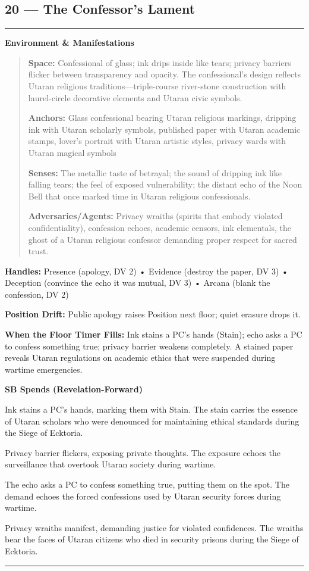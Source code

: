 \documentclass[18pt, letterpaper, twoside]{article}
\newenvironment{floorbox}[1]{%
    \begin{center}
    \begin{minipage}{0.95\textwidth}
    \subsection*{#1}
    \vspace{-0.5em}
    \rule{\textwidth}{0.5pt}
    \vspace{0.5em}
}{%
    \vspace{0.5em}
    \rule{\textwidth}{0.5pt}
    \end{minipage}
    \end{center}
}
\newenvironment{gmnote}[1]{%
    \vspace{0.5em}
    \noindent\textbf{#1}
    \begin{quote}
}{%
    \end{quote}
    \vspace{0.5em}
}
\newcommand{\handles}[1]{\noindent\textbf{Handles:} #1\par}
\newcommand{\sbitem}[2]{\item[#1 SB:] #2}
\begin{document}
\begin{floorbox}{20 --- The Confessor's Lament}
\begin{gmnote}{Environment \& Manifestations}
\textbf{Space:} Confessional of glass; ink drips inside like tears; privacy barriers flicker between transparency and opacity. The confessional's design reflects Utaran religious traditions---triple-course river-stone construction with laurel-circle decorative elements and Utaran civic symbols.

\textbf{Anchors:} Glass confessional bearing Utaran religious markings, dripping ink with Utaran scholarly symbols, published paper with Utaran academic stamps, lover's portrait with Utaran artistic styles, privacy wards with Utaran magical symbols

\textbf{Senses:} The metallic taste of betrayal; the sound of dripping ink like falling tears; the feel of exposed vulnerability; the distant echo of the Noon Bell that once marked time in Utaran religious confessionals.

\textbf{Adversaries/Agents:} Privacy wraiths (spirits that embody violated confidentiality), confession echoes, academic censors, ink elementals, the ghost of a Utaran religious confessor demanding proper respect for sacred trust.
\end{gmnote}

\handles{Presence (apology, DV 2) • Evidence (destroy the paper, DV 3) • Deception (convince the echo it was mutual, DV 3) • Arcana (blank the confession, DV 2)}

\textbf{Position Drift:} Public apology raises Position next floor; quiet erasure drops it.

\textbf{When the Floor Timer Fills:} Ink stains a PC's hands (Stain); echo asks a PC to confess something true; privacy barrier weakens completely. A stained paper reveals Utaran regulations on academic ethics that were suspended during wartime emergencies.

\textbf{SB Spends (Revelation-Forward)}
\begin{description}[leftmargin=*, style=unboxed]
    \sbitem{1}{Ink stains a PC's hands, marking them with Stain. The stain carries the essence of Utaran scholars who were denounced for maintaining ethical standards during the Siege of Ecktoria.}
    \sbitem{2}{Privacy barrier flickers, exposing private thoughts. The exposure echoes the surveillance that overtook Utaran society during wartime.}
    \sbitem{3}{The echo asks a PC to confess something true, putting them on the spot. The demand echoes the forced confessions used by Utaran security forces during wartime.}
    \sbitem{4+}{Privacy wraiths manifest, demanding justice for violated confidences. The wraiths bear the faces of Utaran citizens who died in security prisons during the Siege of Ecktoria.}
\end{description}


\end{floorbox}
\end{document}
